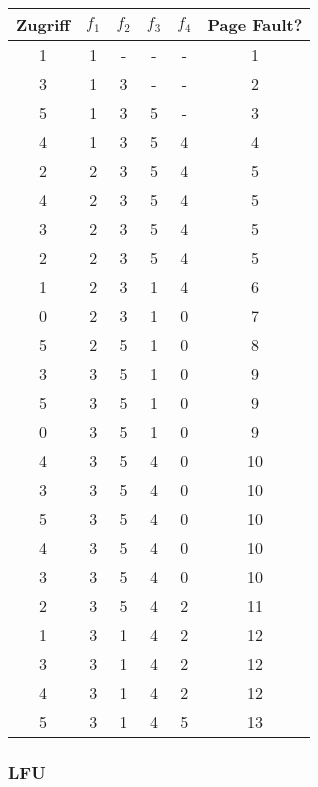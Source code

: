 \documentclass[10pt,a4paper]{article}
\begin{document}
\begin{tabular}{c|c|c|c|c|c}
  Zugriff & $f_{1}$ & $f_{2}$ & $f_{3}$ & $f_{4}$ & Page Fault?\\\hline
  1 & 1 & - & - & - & 1\\
  3 & 1 & 3 & - & - & 2\\
  5 & 1 & 3 & 5 & - & 3\\
  4 & 1 & 3 & 5 & 4 & 4\\
  2 & 2 & 3 & 5 & 4 & 5\\
  4 & 2 & 3 & 5 & 4 & 5\\
  3 & 2 & 3 & 5 & 4 & 5\\
  2 & 2 & 3 & 5 & 4 & 5\\
  1 & 2 & 3 & 1 & 4 & 6\\
  0 & 2 & 3 & 1 & 0 & 7\\
  5 & 2 & 5 & 1 & 0 & 8\\
  3 & 3 & 5 & 1 & 0 & 9\\
  5 & 3 & 5 & 1 & 0 & 9\\
  0 & 3 & 5 & 1 & 0 & 9\\
  4 & 3 & 5 & 4 & 0 & 10\\
  3 & 3 & 5 & 4 & 0 & 10\\
  5 & 3 & 5 & 4 & 0 & 10\\
  4 & 3 & 5 & 4 & 0 & 10\\
  3 & 3 & 5 & 4 & 0 & 10\\
  2 & 3 & 5 & 4 & 2 & 11\\
  1 & 3 & 1 & 4 & 2 & 12\\
  3 & 3 & 1 & 4 & 2 & 12\\
  4 & 3 & 1 & 4 & 2 & 12\\
  5 & 3 & 1 & 4 & 5 & 13
\end{tabular}

\subsubsection*{LFU}
\end{document}
